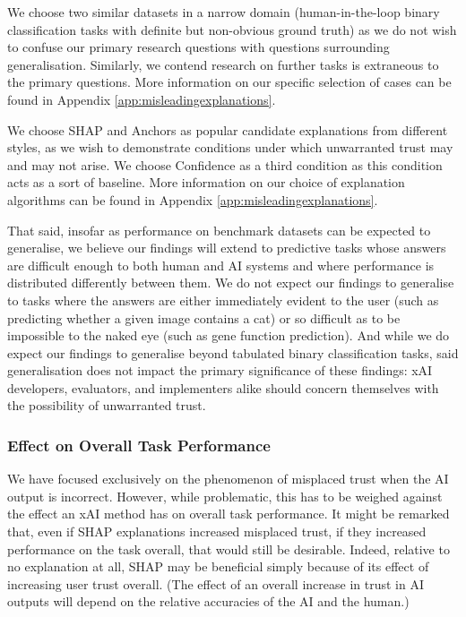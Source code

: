 We choose two similar datasets in a narrow domain (human-in-the-loop binary classification tasks with definite but non-obvious ground truth) as we do not wish to confuse our primary research questions with questions surrounding generalisation. Similarly, we contend research on further tasks is extraneous to the primary questions. More information on our specific selection of cases can be found in Appendix \ref{app:misleadingexplanations}.

We choose SHAP and Anchors as popular candidate explanations from different styles, as we wish to demonstrate conditions under which unwarranted trust may and may not arise. We choose Confidence as a third condition as this condition acts as a sort of baseline. More information on our choice of explanation algorithms can be found in Appendix \ref{app:misleadingexplanations}.

That said, insofar as performance on benchmark datasets can be expected to generalise, we believe our findings will extend to predictive tasks whose answers are difficult enough to both human and AI systems and where performance is distributed differently between them. We do not expect our findings to generalise to tasks where the answers are either immediately evident to the user (such as predicting whether a given image contains a cat) or so difficult as to be impossible to the naked eye (such as gene function prediction). And while we do expect our findings to generalise beyond tabulated binary classification tasks, said generalisation does not impact the primary significance of these findings: xAI developers, evaluators, and implementers alike should concern themselves with the possibility of unwarranted trust.

\subsubsection{Effect on Overall Task Performance}

We have focused exclusively on the phenomenon of misplaced trust when the AI output is incorrect. However, while problematic, this has to be weighed against the effect an xAI method has on overall task performance. It might be remarked that, even if SHAP explanations increased misplaced trust, if they increased performance on the task overall, that would still be desirable. Indeed, relative to no explanation at all, SHAP may be beneficial simply because of its effect of increasing user trust overall. (The effect of an overall increase in trust in AI outputs will depend on the relative accuracies of the AI and the human.)

